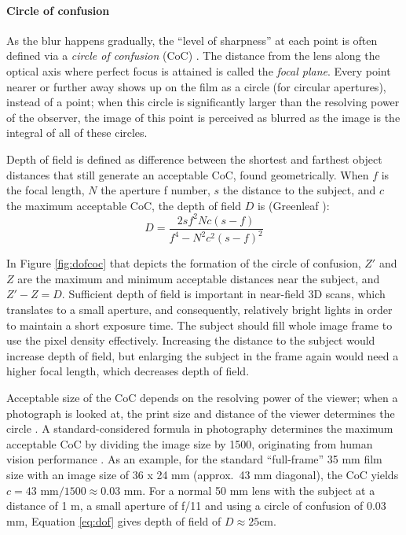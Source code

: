 \paragraph{Circle of confusion}
As the blur happens gradually, the ``level of sharpness'' at each point is often defined via a \emph{circle of confusion} (CoC) \cite[p.~25]{greenleaf1950photographic}.
The distance from the lens along the optical axis where perfect focus is attained is called the \emph{focal plane}.
Every point nearer or further away shows up on the film as a circle (for circular apertures), instead of a point; when this circle is significantly larger than the resolving power of the observer, the image of this point is perceived as blurred as the image is the integral of all of these circles.

Depth of field is defined as difference between the shortest and farthest object distances that still generate an acceptable CoC, found geometrically.
When $f$ is the focal length, $N$ the aperture f number, $s$ the distance to the subject, and $c$ the maximum acceptable CoC, the depth of field $D$ is (Greenleaf \cite[p.~25]{greenleaf1950photographic}):
\begin{equation} \label{eq:dof}
	D = \frac{2 s f^2 N c (s - f)} {f^4 - N^2 c^2 (s - f)^2}
\end{equation}


In Figure \ref{fig:dofcoc} that depicts the formation of the circle of confusion, $Z'$ and $Z$ are the maximum and minimum acceptable distances near the subject, and $Z' - Z = D$.
Sufficient depth of field is important in near-field 3D scans, which translates to a small aperture, and consequently, relatively bright lights in order to maintain a short exposure time.
The subject should fill whole image frame to use the pixel density effectively.
Increasing the distance to the subject would increase depth of field, but enlarging the subject in the frame again would need a higher focal length, which decreases depth of field.

Acceptable size of the CoC depends on the resolving power of the viewer; when a photograph is looked at, the print size and distance of the viewer determines the circle \cite[p.~26]{greenleaf1950photographic}.
A standard-considered formula in photography determines the maximum acceptable CoC by dividing the image size by 1500, originating from human vision performance \cite[p.~88,~92]{kingslake1992optics}.
As an example, for the standard ``full-frame'' 35 mm film size with an image size of 36 x 24 mm (approx.\ 43 mm diagonal), the CoC yields $c = 43 \text{ mm} / 1500 \approx 0.03 \text{ mm}$.
For a normal 50 mm lens with the subject at a distance of 1 m, a small aperture of f/11 and using a circle of confusion of 0.03 mm, Equation \ref{eq:dof} gives depth of field of $D \approx 25 \text{cm}$.

